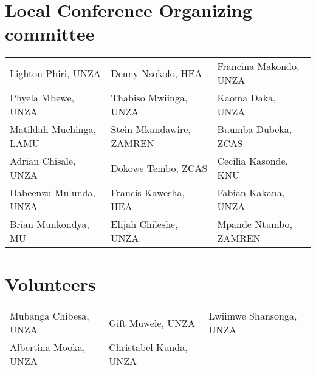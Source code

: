 \section{Local Conference Organizing committee}
\begin{center}
\begin{tabular}{lll}
Lighton Phiri, UNZA & Denny Nsokolo, HEA & Francina Makondo, UNZA \\
Phyela Mbewe, UNZA & Thabiso Mwiinga, UNZA &  Kaoma Daka, UNZA \\
Matildah Muchinga, LAMU  & Stein Mkandawire, ZAMREN & Buumba Dubeka, ZCAS \\
Adrian Chisale, UNZA & Dokowe Tembo, ZCAS & Cecilia Kasonde, KNU \\
Habeenzu Mulunda, UNZA & Francis Kawesha, HEA & Fabian Kakana, UNZA \\
Brian Munkondya, MU & Elijah Chileshe, UNZA & Mpande Ntumbo, ZAMREN \\
\end{tabular}

\section{Volunteers}
\begin{center}
\begin{tabular}{lll}
Mubanga Chibesa, UNZA & Gift Muwele, UNZA & Lwiimwe Shansonga, UNZA \\
Albertina Mooka, UNZA & Christabel Kunda, UNZA &  \\

\end{tabular}


\end{center}
\end{center}
